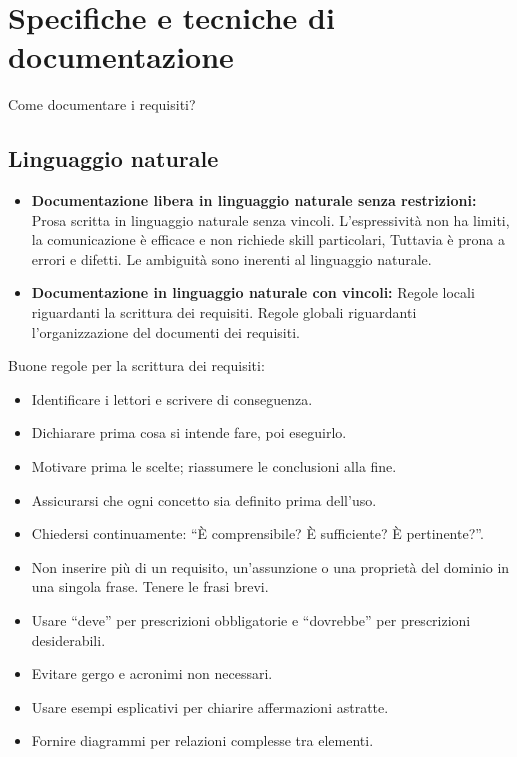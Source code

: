 \documentclass[../main.tex]{subfiles}
\begin{document}
\section{Specifiche e tecniche di documentazione}
Come documentare i requisiti?
\subsection{Linguaggio naturale}
\begin{itemize}
	\item \textbf{Documentazione libera in linguaggio naturale senza restrizioni:} 
	Prosa scritta in linguaggio naturale senza vincoli. L'espressività non ha limiti, la comunicazione è efficace e non richiede skill particolari, Tuttavia è prona a errori e difetti.
	Le ambiguità sono inerenti al linguaggio naturale.
	\item \textbf{Documentazione in linguaggio naturale con vincoli:}
	Regole locali riguardanti la scrittura dei requisiti. Regole globali riguardanti l'organizzazione del documenti dei requisiti.
\end{itemize}
Buone regole per la scrittura dei requisiti:
\begin{itemize}
	\item Identificare i lettori e scrivere di conseguenza.
	\item Dichiarare prima cosa si intende fare, poi eseguirlo.
	\item Motivare prima le scelte; riassumere le conclusioni alla fine.
	\item Assicurarsi che ogni concetto sia definito prima dell'uso.
	\item Chiedersi continuamente: ``È comprensibile? È sufficiente? È pertinente?''.
	\item Non inserire più di un requisito, un'assunzione o una proprietà del dominio in una singola frase. Tenere le frasi brevi.
	\item Usare ``deve'' per prescrizioni obbligatorie e ``dovrebbe'' per prescrizioni desiderabili.
	\item Evitare gergo e acronimi non necessari.
	\item Usare esempi esplicativi per chiarire affermazioni astratte.
	\item Fornire diagrammi per relazioni complesse tra elementi.
\end{itemize}
\end{document}
